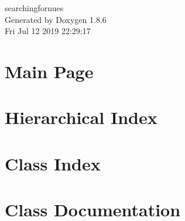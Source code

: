 \documentclass[twoside]{book}
\newcommand{\clearemptydoublepage}{%
  \newpage{\pagestyle{empty}\cleardoublepage}%
}
\begin{document}
\hypersetup{pageanchor=false}
\begin{titlepage}
\vspace*{7cm}
\begin{center}%
{\Large searchingfornues }\\
\vspace*{1cm}
{\large Generated by Doxygen 1.8.6}\\
\vspace*{0.5cm}
{\small Fri Jul 12 2019 22:29:17}\\
\end{center}
\end{titlepage}
\clearemptydoublepage
\tableofcontents
\clearemptydoublepage
{}
\hypersetup{pageanchor=true}

\chapter{Main Page}
\label{index}\hypertarget{index}{}
\chapter{Hierarchical Index}

\chapter{Class Index}

\chapter{Class Documentation}








































\newpage
{}
{}
\printindex
\end{document}
